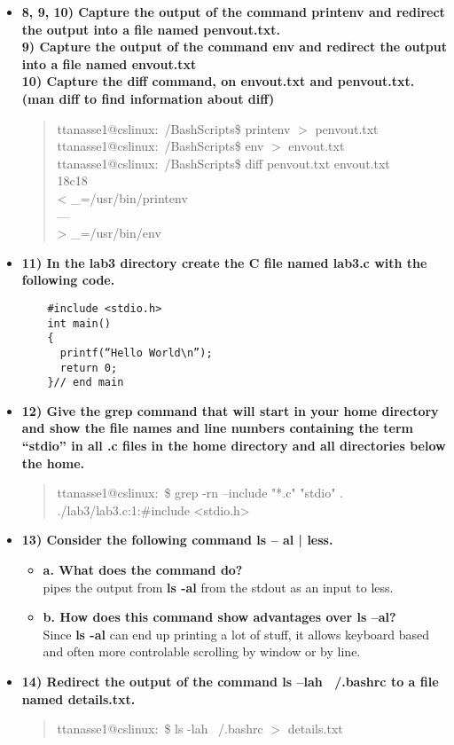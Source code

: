 \documentclass{article}
\begin{document}
\begin{itemize}
  \item \textbf{8, 9, 10) Capture the output of the command printenv and redirect the output into a file named penvout.txt.}\\
  \textbf{9) Capture the output of the command env and redirect the output into a file named envout.txt}\\
  \textbf{10) Capture the diff command, on envout.txt and penvout.txt. (man diff to find information about diff)}
  \begin{quote}
  ttanasse1@cslinux:~/BashScripts\$ printenv $>$ penvout.txt\\
ttanasse1@cslinux:~/BashScripts\$ env $>$ envout.txt\\
    ttanasse1@cslinux:~/BashScripts\$ diff penvout.txt  envout.txt \\
18c18\\
< \_=/usr/bin/printenv\\
---\\
> \_=/usr/bin/env
  \end{quote}
  \pagebreak
  \item \textbf{11) In the lab3 directory create the C file named lab3.c with the following code.}\\
  \begin{lstlisting}
    #include <stdio.h>
    int main()
    {
      printf(“Hello World\n”); 
      return 0;
    }// end main
  \end{lstlisting}
  \item \textbf{12) Give the grep command that will start in your home directory and show the file names and line numbers containing the term “stdio” in all .c files in the home directory and all directories below the home.}
  \begin{quote}
    ttanasse1@cslinux:~\$ grep -rn --include "*.c" "stdio" .\\
./lab3/lab3.c:1:\#include <stdio.h>
  \end{quote}
  \item \textbf{13) Consider the following command ls – al | less.}
  \begin{itemize}
    \item \textbf{a. What does the command do?}\\
    pipes the output from \textbf{ls -al} from the stdout as an input to less.\\
    \item \textbf{b. How does this command show advantages over ls –al?}\\
    Since \textbf{ls -al} can end up printing a lot of stuff, it allows keyboard based and often more controlable scrolling by window or by line.
  \end{itemize}
  \item \textbf{14) Redirect the output of the command ls –lah ~/.bashrc to a file named details.txt. }
  \begin{quote}
    ttanasse1@cslinux:~\$ ls -lah ~/.bashrc $>$ details.txt


\end{quote}
\end{itemize}
\end{document}
